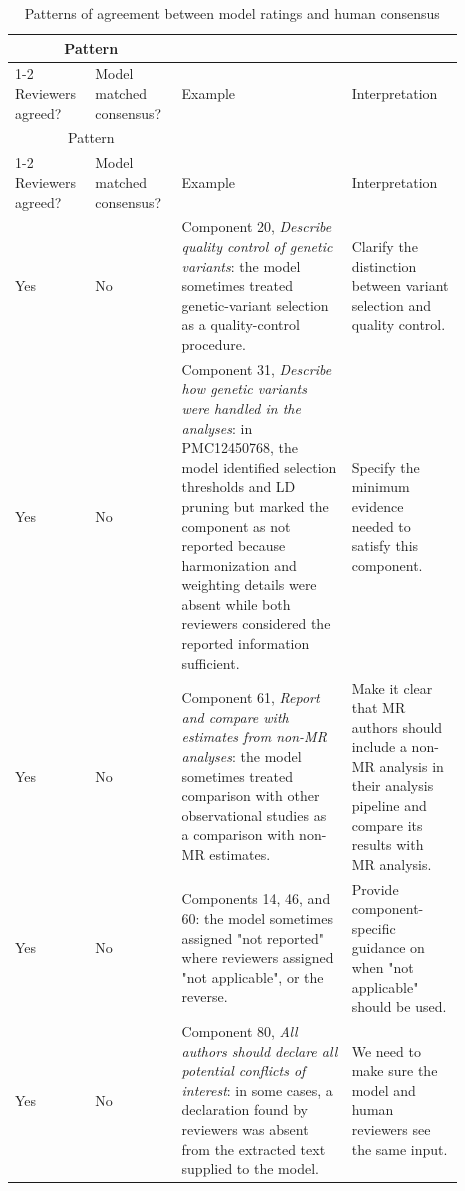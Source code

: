 \begin{longtable}{@{}p{0.14\linewidth}p{0.17\linewidth}p{0.35\linewidth}p{0.23\linewidth}@{}}
\caption{Patterns of agreement between model ratings and human consensus}
\label{tab:model:agreement-patterns}\\

\toprule
\multicolumn{2}{c}{Pattern} & & \\
\cmidrule(lr){1-2}
Reviewers agreed? & Model matched consensus? & Example & Interpretation \\
\midrule
\endfirsthead

\toprule
\multicolumn{2}{c}{Pattern} & & \\
\cmidrule(lr){1-2}
Reviewers agreed? & Model matched consensus? & Example & Interpretation \\
\midrule
\endhead

\bottomrule
\endfoot

Yes & No &
Component 20, \textit{Describe quality control of genetic variants}: the model sometimes treated genetic-variant selection as a quality-control procedure. &
Clarify the distinction between variant selection and quality control. \\

Yes & No &
Component 31, \textit{Describe how genetic variants were handled in the analyses}: in PMC12450768, the model identified selection thresholds and LD pruning but marked the component as not reported because harmonization and weighting details were absent while both reviewers considered the reported information sufficient. &
Specify the minimum evidence needed to satisfy this component. \\

Yes & No &
Component 61, \textit{Report and compare with estimates from non-MR analyses}: the model sometimes treated comparison with other observational studies as a comparison with non-MR estimates. &
Make it clear that MR authors should include a non-MR analysis in their analysis pipeline and compare its results with MR analysis. \\

Yes & No &
Components 14, 46, and 60: the model sometimes assigned "not reported" where reviewers assigned "not applicable", or the reverse. &
Provide component-specific guidance on when "not applicable" should be used. \\

Yes & No &
Component 80, \textit{All authors should declare all potential conflicts of interest}: in some cases, a declaration found by reviewers was absent from the extracted text supplied to the model. &
We need to make sure the model and human reviewers see the same input. \\


\end{longtable}
